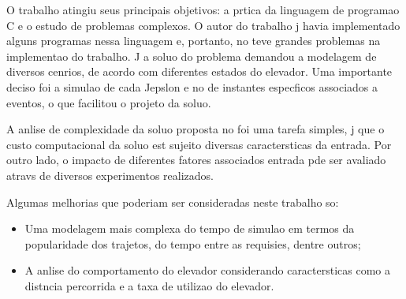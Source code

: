 \documentclass[12pt]{article}
\begin{document}
O trabalho atingiu seus principais objetivos: a prtica da linguagem de programao C e o estudo de problemas complexos. O autor do trabalho j havia implementado alguns programas nessa linguagem e, portanto, no teve grandes problemas na implementao do trabalho. J a soluo do problema demandou a modelagem de diversos cenrios, de acordo com diferentes estados do elevador. Uma importante deciso foi a simulao de cada Jepslon e no de instantes especficos associados a eventos, o que facilitou o projeto da soluo.

A anlise de complexidade da soluo proposta no foi uma tarefa simples, j que o custo computacional da soluo est sujeito  diversas caractersticas da entrada. Por outro lado, o impacto de diferentes fatores associados  entrada pde ser avaliado atravs de diversos experimentos realizados.

Algumas melhorias que poderiam ser consideradas neste trabalho so:
\begin{itemize}
\item Uma modelagem mais complexa do tempo de simulao em termos da popularidade dos trajetos, do tempo entre as requisies, dentre outros;
\item A anlise do comportamento do elevador considerando caractersticas como a distncia percorrida e a taxa de utilizao do elevador.
\end{itemize}


\end{document}
